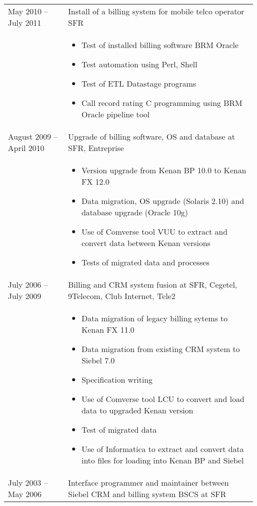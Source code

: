 \documentclass[a4paper,11pt]{article}
\begin{document}
\begin{longtable}{p{}p{}}
May 2010 -- July 2011 & Install of a billing system for mobile telco operator SFR \\
& \begin{itemize}
\item Test of installed billing software BRM Oracle
\item Test automation using Perl, Shell
\item Test of ETL Datastage programs
\item Call record rating C programming using BRM Oracle pipeline tool
\end{itemize} \\
	
August 2009 -- April 2010 & Upgrade of billing software, OS and database at SFR, Entreprise\\
& \begin{itemize}
\item        Version upgrade from Kenan BP 10.0 to Kenan FX 12.0
\item        Data migration, OS upgrade (Solaris 2.10) and database upgrade (Oracle 10g)
\item        Use of Comverse tool VUU to extract and convert data between Kenan versions
\item        Tests of migrated data and processes
\end{itemize} \\


July 2006 -- July 2009 & Billing and CRM system fusion at SFR, Cegetel, 9Telecom, Club Internet, Tele2 \\
	
& \begin{itemize}
\item         Data migration of legacy billing sytems to Kenan FX 11.0
\item         Data migration from existing CRM system to Siebel 7.0
\item         Specification writing
\item         Use of Comverse tool LCU to convert and load data to upgraded Kenan version
\item         Test of migrated data
\item         Use of Informatica to extract and convert data into files for loading into Kenan BP and Siebel
\end{itemize} \\

July 2003 -- May 2006 & Interface programmer and maintainer between Siebel CRM and billing system BSCS at SFR \\
	


\end{longtable}
\end{document}
